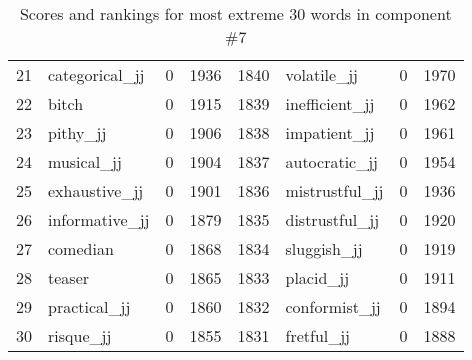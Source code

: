 \begin{table}[tbp]
\begin{tabular}{| rlr@{.}l | rlr@{.}l |}
    21 & categorical\_jj & 0 & 1936    &    1840 & volatile\_jj & 0 & 1970 \\
    22 & bitch & 0 & 1915    &    1839 & inefficient\_jj & 0 & 1962 \\
    23 & pithy\_jj & 0 & 1906    &    1838 & impatient\_jj & 0 & 1961 \\
    24 & musical\_jj & 0 & 1904    &    1837 & autocratic\_jj & 0 & 1954 \\
    25 & exhaustive\_jj & 0 & 1901    &    1836 & mistrustful\_jj & 0 & 1936 \\
    26 & informative\_jj & 0 & 1879    &    1835 & distrustful\_jj & 0 & 1920 \\
    27 & comedian & 0 & 1868    &    1834 & sluggish\_jj & 0 & 1919 \\
    28 & teaser & 0 & 1865    &    1833 & placid\_jj & 0 & 1911 \\
    29 & practical\_jj & 0 & 1860    &    1832 & conformist\_jj & 0 & 1894 \\
    30 & risque\_jj & 0 & 1855    &    1831 & fretful\_jj & 0 & 1888 \\
    \hline
    \end{tabular}
    \caption{Scores and rankings for most extreme 30 words in component \#7} 
\end{table}
\clearpage
